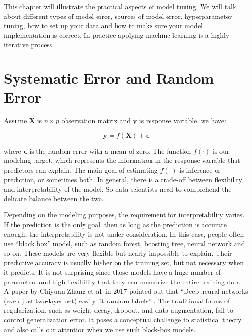 \documentclass[12pt,]{krantz}
\theoremstyle{definition}
\theoremstyle{definition}
\theoremstyle{remark}
\begin{document}
This chapter will illustrate the practical aspects of model tuning. We
will talk about different types of model error, sources of model error,
hyperparameter tuning, how to set up your data and how to make sure your
model implementation is correct. In practice applying machine learning
is a highly iterative process.

\section{Systematic Error and Random
Error}\label{systematic-error-and-random-error}

Assume \(\mathbf{X}\) is \(n \times p\) observation matrix and
\(\mathbf{y}\) is response variable, we have:

\[\mathbf{y}=f(\mathbf{X})+\mathbf{\epsilon}\]

where \(\mathbf{\epsilon}\) is the random error with a mean of zero. The
function \(f(\cdot)\) is our modeling target, which represents the
information in the response variable that predictors can explain. The
main goal of estimating \(f(\cdot)\) is inference or prediction, or
sometimes both. In general, there is a trade-off between flexibility and
interpretability of the model. So data scientists need to comprehend the
delicate balance between the two.

Depending on the modeling purposes, the requirement for interpretability
varies. If the prediction is the only goal, then as long as the
prediction is accurate enough, the interpretability is not under
consideration. In this case, people often use ``black box'' model, such
as random forest, boosting tree, neural network and so on. These models
are very flexible but nearly impossible to explain. Their predictive
accuracy is usually higher on the training set, but not necessary when
it predicts. It is not surprising since those models have a huge number
of parameters and high flexibility that they can memorize the entire
training data. A paper by Chiyuan Zhang et al. in 2017 pointed out that
``Deep neural networks (even just two-layer net) easily fit random
labels'' \citep{rethinkDL}. The traditional forms of regularization,
such as weight decay, dropout, and data augmentation, fail to control
generalization error. It poses a conceptual challenge to statistical
theory and also calls our attention when we use such black-box models.
\end{document}
